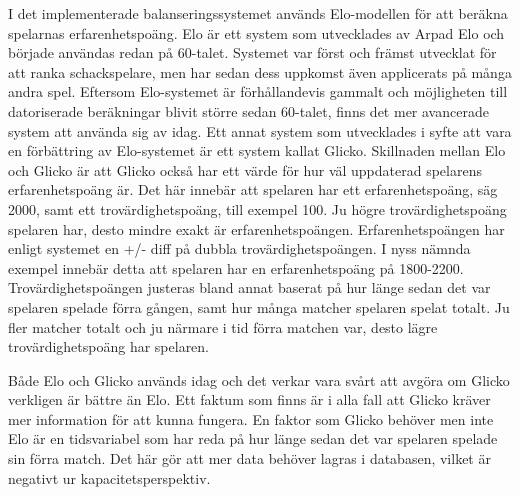 \documentclass[a4paper, 11pt]{article}
\begin{document}
I det implementerade balanseringssystemet används Elo-modellen för att beräkna spelarnas erfarenhetspoäng. Elo är ett system som utvecklades av Arpad Elo och började användas redan på 60-talet\cite{elo}. Systemet var först och främst utvecklat för att ranka schackspelare, men har sedan dess uppkomst även applicerats på många andra spel. Eftersom Elo-systemet är förhållandevis gammalt och möjligheten till datoriserade beräkningar blivit större sedan 60-talet, finns det mer avancerade system att använda sig av idag. Ett annat system som utvecklades i syfte att vara en förbättring av Elo-systemet är ett system kallat Glicko\cite{chessratings}. Skillnaden mellan Elo och Glicko är att Glicko också har ett värde för hur väl uppdaterad spelarens erfarenhetspoäng är. Det här innebär att spelaren har ett erfarenhetspoäng, säg 2000, samt ett trovärdighetspoäng, till exempel 100. Ju högre trovärdighetspoäng spelaren har, desto mindre exakt är erfarenhetspoängen. Erfarenhetspoängen har enligt systemet en +/- diff på dubbla trovärdighetspoängen. I nyss nämnda exempel innebär detta att spelaren har en erfarenhetspoäng på 1800-2200. Trovärdighetspoängen justeras bland annat baserat på hur länge sedan det var spelaren spelade förra gången, samt hur många matcher spelaren spelat totalt. Ju fler matcher totalt och ju närmare i tid förra matchen var, desto lägre trovärdighetspoäng har spelaren.

Både Elo och Glicko används idag och det verkar vara svårt att avgöra om Glicko verkligen är bättre än Elo\cite{stackchess}. Ett faktum som finns är i alla fall att Glicko kräver mer information för att kunna fungera. En faktor som Glicko behöver men inte Elo är en tidsvariabel som har reda på hur länge sedan det var spelaren spelade sin förra match\cite{glickoex}. Det här gör att mer data behöver lagras i databasen, vilket är negativt ur kapacitetsperspektiv.
\end{document}
